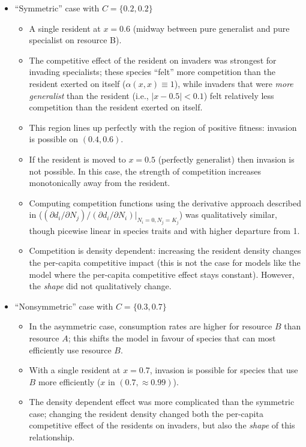 \documentclass[a4paper,11pt]{article}
\begin{document}
\begin{itemize}
\item ``Symmetric'' case with $C = \{0.2, 0.2\}$
  \begin{itemize}
  \item A single resident at $x = 0.6$ (midway between pure generalist
    and pure specialist on resource B).
  \item The competitive effect of the resident on invaders was
    strongest for invading specialists; these species ``felt'' more
    competition than the resident exerted on itself ($\alpha(x, x)
    \equiv 1$), while invaders that were \emph{more generalist} than
    the resident (i.e., $|x - 0.5| < 0.1$) felt relatively less
    competition than the resident exerted on itself.
  \item This region lines up perfectly with the region of positive
    fitness: invasion is possible on $(0.4, 0.6)$.
  \item If the resident is moved to $x = 0.5$ (perfectly generalist)
    then invasion is not possible.  In this case, the strength of
    competition increases monotonically away from the resident.
  \item Computing competition functions using the derivative approach
    described in \citet{Abrams-2008} ($(\partial d_i / \partial N_j) /
    (\partial d_i / \partial N_i) |_{N_i = 0, N_j = K_j}$) was
    qualitatively similar, though picewise linear in species traits
    and with higher departure from 1.
  \item Competition is density dependent: increasing the resident
    density changes the per-capita competitive impact (this is not the
    case for models like the \citet{Dieckmann-1999} model where the
    per-capita competitive effect stays constant).  However, the
    \emph{shape} did not qualitatively change.
  \end{itemize}
\item ``Nonsymmetric'' case with $C = \{0.3, 0.7\}$
  \begin{itemize}
  \item In the asymmetric case, consumption rates are higher for
    resource $B$ than resource $A$; this shifts the model in favour of
    species that can most efficiently use resource $B$.
  \item With a single resident at $x = 0.7$, invasion is possible for
    species that use $B$ more efficiently ($x$ in $(0.7, \approx
    0.99)$).
  \item The density dependent effect was more complicated than the
    symmetric case; changing the resident density changed both the
    per-capita competitive effect of the residents on invaders, but
    also the \emph{shape} of this relationship.
  \end{itemize}
\end{itemize}
\end{document}
